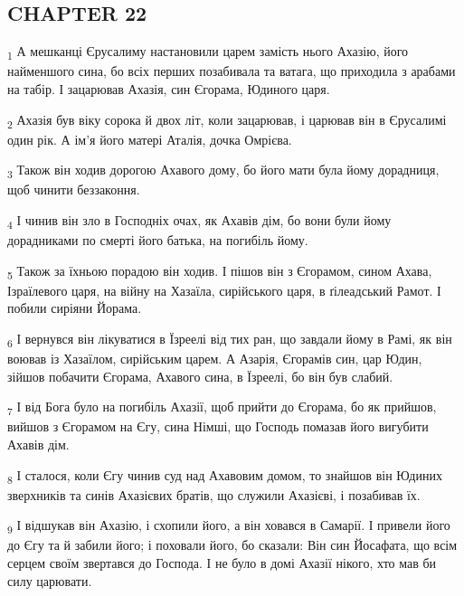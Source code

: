 \subsection{CHAPTER 22}
\begin{tcolorbox}
\textsubscript{1} А мешканці Єрусалиму настановили царем замість нього Ахазію, його найменшого сина, бо всіх перших позабивала та ватага, що приходила з арабами на табір. І зацарював Ахазія, син Єгорама, Юдиного царя.
\end{tcolorbox}
\begin{tcolorbox}
\textsubscript{2} Ахазія був віку сорока й двох літ, коли зацарював, і царював він в Єрусалимі один рік. А ім'я його матері Аталія, дочка Омрієва.
\end{tcolorbox}
\begin{tcolorbox}
\textsubscript{3} Також він ходив дорогою Ахавого дому, бо його мати була йому дорадниця, щоб чинити беззаконня.
\end{tcolorbox}
\begin{tcolorbox}
\textsubscript{4} І чинив він зло в Господніх очах, як Ахавів дім, бо вони були йому дорадниками по смерті його батька, на погибіль йому.
\end{tcolorbox}
\begin{tcolorbox}
\textsubscript{5} Також за їхньою порадою він ходив. І пішов він з Єгорамом, сином Ахава, Ізраїлевого царя, на війну на Хазаїла, сирійського царя, в ґілеадський Рамот. І побили сиріяни Йорама.
\end{tcolorbox}
\begin{tcolorbox}
\textsubscript{6} І вернувся він лікуватися в Їзреелі від тих ран, що завдали йому в Рамі, як він воював із Хазаїлом, сирійським царем. А Азарія, Єгорамів син, цар Юдин, зійшов побачити Єгорама, Ахавого сина, в Їзреелі, бо він був слабий.
\end{tcolorbox}
\begin{tcolorbox}
\textsubscript{7} І від Бога було на погибіль Ахазії, щоб прийти до Єгорама, бо як прийшов, вийшов з Єгорамом на Єгу, сина Німші, що Господь помазав його вигубити Ахавів дім.
\end{tcolorbox}
\begin{tcolorbox}
\textsubscript{8} І сталося, коли Єгу чинив суд над Ахавовим домом, то знайшов він Юдиних зверхників та синів Ахазієвих братів, що служили Ахазієві, і позабивав їх.
\end{tcolorbox}
\begin{tcolorbox}
\textsubscript{9} І відшукав він Ахазію, і схопили його, а він ховався в Самарії. І привели його до Єгу та й забили його; і поховали його, бо сказали: Він син Йосафата, що всім серцем своїм звертався до Господа. І не було в домі Ахазії нікого, хто мав би силу царювати.
\end{tcolorbox}
